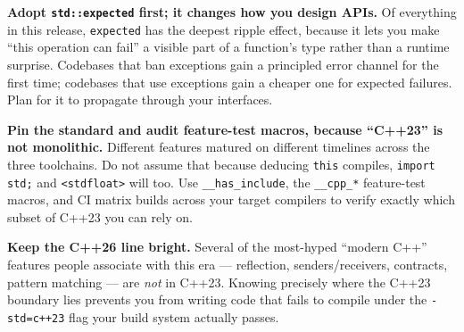 \textbf{Adopt \lstinline|std::expected| first; it changes how you design APIs.} Of everything in this release, \lstinline|expected| has the deepest ripple effect, because it lets you make ``this operation can fail'' a visible part of a function's type rather than a runtime surprise. Codebases that ban exceptions gain a principled error channel for the first time; codebases that use exceptions gain a cheaper one for expected failures. Plan for it to propagate through your interfaces.

\textbf{Pin the standard and audit feature-test macros, because ``C++23'' is not monolithic.} Different features matured on different timelines across the three toolchains. Do not assume that because deducing \lstinline|this| compiles, \lstinline|import std;| and \lstinline|<stdfloat>| will too. Use \lstinline|__has_include|, the \lstinline|__cpp_*| feature-test macros, and CI matrix builds across your target compilers to verify exactly which subset of C++23 you can rely on.

\textbf{Keep the C++26 line bright.} Several of the most-hyped ``modern C++'' features people associate with this era --- reflection, senders/receivers, contracts, pattern matching --- are \emph{not} in C++23. Knowing precisely where the C++23 boundary lies prevents you from writing code that fails to compile under the \lstinline|-std=c++23| flag your build system actually passes.
